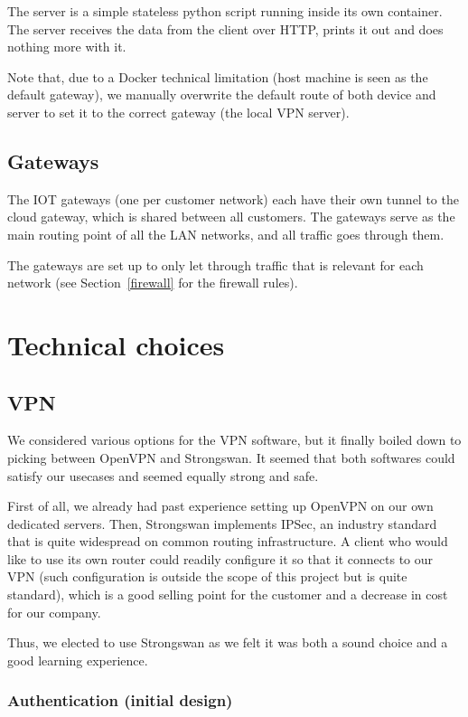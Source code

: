 \documentclass[paper=a4, fontsize=11pt]{scrartcl}
\begin{document}
The server is a simple stateless python script running inside its
own container.
The server receives the data from the client over HTTP, prints it out and does
nothing more with it.

Note that, due to a Docker technical limitation (host machine is seen as the
default gateway), we manually overwrite the default route of both device and
server to set it to the correct gateway (the local VPN server).

\subsection{Gateways}

The IOT gateways (one per customer network) each have their own tunnel to the
cloud gateway, which is shared between all customers.
The gateways serve as the main routing point of all the LAN networks, and all
traffic goes through them.

The gateways are set up to only let through traffic that is relevant for each
network (see Section~\ref{firewall} for the firewall rules).

\section{Technical choices}

\subsection{VPN}

We considered various options for the VPN software, but it finally boiled down
to picking between OpenVPN and Strongswan.
It seemed that both softwares could satisfy our usecases and seemed equally
strong and safe.

First of all, we already had past experience setting up OpenVPN on our own
dedicated servers.
Then, Strongswan implements IPSec, an industry standard that is quite widespread
on common routing infrastructure.
A client who would like to use its own router could readily configure
it so that it connects to our VPN (such configuration is outside the
scope of this project but is quite standard), which is a good selling point for
the customer and a decrease in cost for our company.

Thus, we elected to use Strongswan as we felt it was both a sound choice and a
good learning experience.

\subsubsection{Authentication (initial design)}
\end{document}
